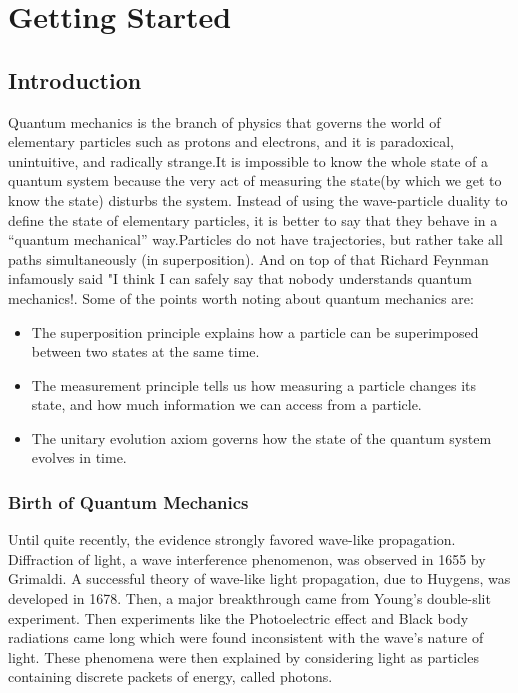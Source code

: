 \chapter{Getting Started}
\section{Introduction}
Quantum mechanics is the branch of physics that governs the world of elementary particles such as protons and electrons, and it is paradoxical, unintuitive, and radically strange.It is impossible to know the whole state of a quantum system because the very act of measuring the state(by which we get to know the state) disturbs the system. Instead of using the wave-particle duality to define the state of elementary particles, it is better to say that they behave in a “quantum mechanical” way.Particles do not have trajectories, but rather take all paths simultaneously (in superposition). And on top of that Richard Feynman infamously said "I think I can safely say that nobody understands quantum mechanics!. Some of the points worth noting about quantum mechanics are:
\begin{itemize}
  \item The superposition principle explains how a particle can be superimposed between two states at the same time.
  \item The measurement principle tells us how measuring a particle changes its state, and how much information we can access from a particle.
  \item   The unitary evolution axiom governs how the state of the quantum system evolves in time.
\end{itemize}

\subsection{ Birth of Quantum Mechanics}
Until quite recently, the evidence strongly favored wave-like propagation. Diffraction of light, a wave interference phenomenon, was observed in 1655 by Grimaldi. A successful theory of wave-like light propagation, due to Huygens, was developed in 1678. Then, a major breakthrough came from Young’s double-slit experiment. Then experiments like the Photoelectric effect and Black body radiations came long which were found inconsistent with the wave’s nature of light. These phenomena were then explained by considering light as particles containing discrete packets of energy, called photons.

